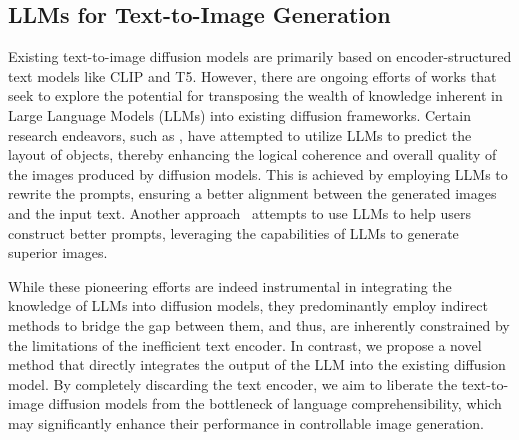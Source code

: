 \subsection{LLMs for Text-to-Image Generation}
Existing text-to-image diffusion models are primarily based on encoder-structured text models like CLIP and T5. However, there are ongoing efforts of works that seek to explore the potential for transposing the wealth of knowledge inherent in Large Language Models (LLMs) into existing diffusion frameworks. Certain research endeavors, such as \cite{LLM_Grounded, LLM_Blueprint}, have attempted to utilize LLMs to predict the layout of objects, thereby enhancing the logical coherence and overall quality of the images produced by diffusion models. This is achieved by employing LLMs to rewrite the prompts, ensuring a better alignment between the generated images and the input text. Another approach~\cite{PromptCrafter} attempts to use LLMs to help users construct better prompts, leveraging the capabilities of LLMs to generate superior images.

While these pioneering efforts are indeed instrumental in integrating the knowledge of LLMs into diffusion models, they predominantly employ indirect methods to bridge the gap between them, and thus, are inherently constrained by the limitations of the inefficient text encoder. In contrast, we propose a novel method that directly integrates the output of the LLM into the existing diffusion model. By completely discarding the text encoder, we aim to liberate the text-to-image diffusion models from the bottleneck of language comprehensibility, which may significantly enhance their performance in controllable image generation.